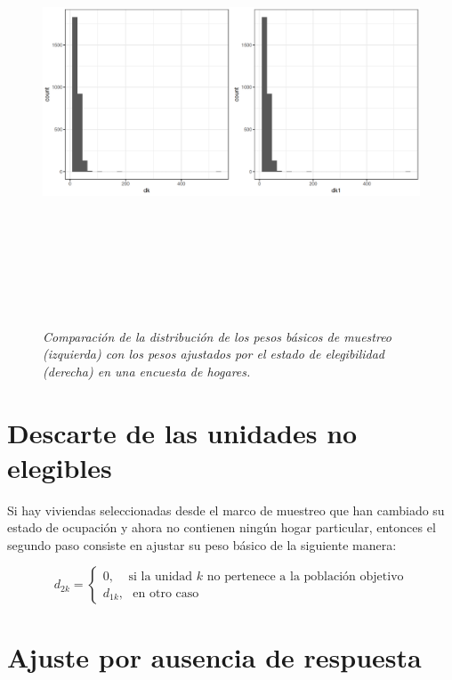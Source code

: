 \documentclass[
  10pt,
  spanish,
]{book}
\begin{document}
\begin{figure}
\centering
\includegraphics[width=\textwidth,height=5.20833in]{Pics/16.png}
\caption{\emph{Comparación de la distribución de los pesos básicos de muestreo (izquierda) con los pesos ajustados por el estado de elegibilidad (derecha) en una encuesta de hogares.}}
\end{figure}

\hypertarget{descarte-de-las-unidades-no-elegibles}{%
\section{Descarte de las unidades no elegibles}\label{descarte-de-las-unidades-no-elegibles}}

Si hay viviendas seleccionadas desde el marco de muestreo que han cambiado su estado de ocupación y ahora no contienen ningún hogar particular, entonces el segundo paso consiste en ajustar su peso básico de la siguiente manera:

\[
d_{2k} = 
\begin{cases}
0, \ \ \ \ \ \text{si la unidad $k$ no pertenece a la población objetivo}\\
d_{1k},\ \ \ \text{en otro caso }
\end{cases}
\]

\hypertarget{ajuste-por-ausencia-de-respuesta}{%
\section{Ajuste por ausencia de respuesta}\label{ajuste-por-ausencia-de-respuesta}}
\end{document}
